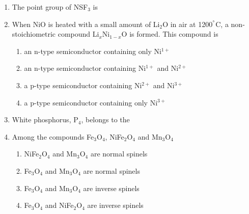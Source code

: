 \documentclass[12pt]{article}
\begin{document}
\begin{enumerate}
\item The point group of NSF$_3$ is
\begin{enumerate}
    \hfill{}
\end{enumerate}

\item When NiO is heated with a small amount of Li$_2$O in air at 1200$^\degree$C, a non-stoichiometric compound Li$_x$Ni$_{1-x}$O is formed. This compound is
\begin{enumerate}
\item  an n-type semiconductor containing only Ni$^{1+}$
\item an n-type semiconductor containing Ni$^{1+}$ and Ni$^{2+}$
\item a p-type semiconductor containing Ni$^{2+}$ and Ni$^{3+}$
\item a p-type semiconductor containing only Ni$^{3+}$    \hfill{}
\end{enumerate}
\degree




\item White phosphorus, P$_4$, belongs to the
\begin{enumerate}
  \hfill{}
\end{enumerate}

\item Among the compounds Fe$_3$O$_4$, NiFe$_2$O$_4$ and Mn$_3$O$_4$
\begin{enumerate}
\item NiFe$_2$O$_4$ and Mn$_3$O$_4$ are normal spinels
\item Fe$_3$O$_4$ and Mn$_3$O$_4$ are normal spinels
\item Fe$_3$O$_4$ and Mn$_3$O$_4$ are inverse spinels
\item Fe$_3$O$_4$ and NiFe$_2$O$_4$ are inverse spinels    \hfill{}
\end{enumerate}


\end{enumerate}
\end{document}
